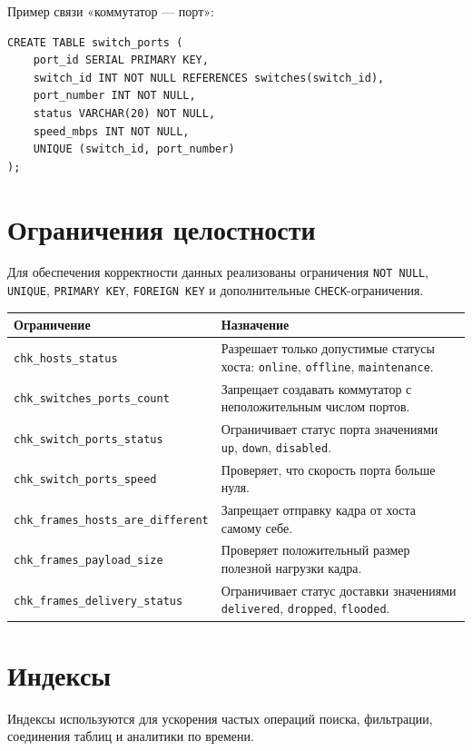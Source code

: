 \documentclass[12pt,a4paper]{article}
\begin{document}
Пример связи «коммутатор --- порт»:

\begin{lstlisting}[caption={Порты коммутаторов}]
CREATE TABLE switch_ports (
    port_id SERIAL PRIMARY KEY,
    switch_id INT NOT NULL REFERENCES switches(switch_id),
    port_number INT NOT NULL,
    status VARCHAR(20) NOT NULL,
    speed_mbps INT NOT NULL,
    UNIQUE (switch_id, port_number)
);
\end{lstlisting}

\section{Ограничения целостности}

Для обеспечения корректности данных реализованы ограничения \texttt{NOT NULL}, \texttt{UNIQUE}, \texttt{PRIMARY KEY}, \texttt{FOREIGN KEY} и дополнительные \texttt{CHECK}-ограничения.

\begin{longtable}{|p{5cm}|p{9.5cm}|}
\hline
\textbf{Ограничение} & \textbf{Назначение}\\
\hline
\texttt{chk\_hosts\_status} & Разрешает только допустимые статусы хоста: \texttt{online}, \texttt{offline}, \texttt{maintenance}.\\
\hline
\texttt{chk\_switches\_ports\_count} & Запрещает создавать коммутатор с неположительным числом портов.\\
\hline
\texttt{chk\_switch\_ports\_status} & Ограничивает статус порта значениями \texttt{up}, \texttt{down}, \texttt{disabled}.\\
\hline
\texttt{chk\_switch\_ports\_speed} & Проверяет, что скорость порта больше нуля.\\
\hline
\texttt{chk\_frames\_hosts\_are\_different} & Запрещает отправку кадра от хоста самому себе.\\
\hline
\texttt{chk\_frames\_payload\_size} & Проверяет положительный размер полезной нагрузки кадра.\\
\hline
\texttt{chk\_frames\_delivery\_status} & Ограничивает статус доставки значениями \texttt{delivered}, \texttt{dropped}, \texttt{flooded}.\\
\hline
\end{longtable}

\section{Индексы}

Индексы используются для ускорения частых операций поиска, фильтрации, соединения таблиц и аналитики по времени.
\end{document}
